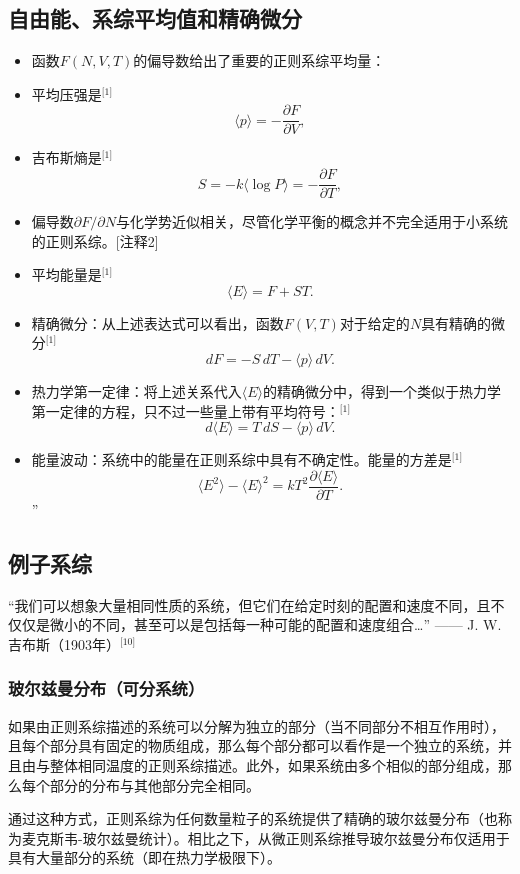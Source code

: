 \subsection{自由能、系综平均值和精确微分}  
\begin{itemize}
\item 函数\( F(N, V, T) \)的偏导数给出了重要的正则系综平均量：  
\item 平均压强是\(^\text{[1]}\)  
\[
\langle p \rangle = -\frac{\partial F}{\partial V},~
\]  
\item 吉布斯熵是\(^\text{[1]}\)  
\[
S = -k \langle \log P \rangle = -\frac{\partial F}{\partial T},~
\]  
\item 偏导数\(\partial F/\partial N\)与化学势近似相关，尽管化学平衡的概念并不完全适用于小系统的正则系综。[注释2]  
\item 平均能量是\(^\text{[1]}\)  
\[
\langle E \rangle = F + S T.~
\]  
\item 精确微分：从上述表达式可以看出，函数\( F(V, T) \)对于给定的\( N \)具有精确的微分\(^\text{[1]}\)  
\[
dF = -S \, dT - \langle p \rangle \, dV.~
\]  
\item 热力学第一定律：将上述关系代入\( \langle E \rangle \)的精确微分中，得到一个类似于热力学第一定律的方程，只不过一些量上带有平均符号：\(^\text{[1]}\)  
\[
d \langle E \rangle = T \, dS - \langle p \rangle \, dV.~
\]  
\item 能量波动：系统中的能量在正则系综中具有不确定性。能量的方差是\(^\text{[1]}\)  
\[
\langle E^2 \rangle - \langle E \rangle^2 = k T^2 \frac{\partial \langle E \rangle}{\partial T}.~
\]”
\end{itemize}
\subsection{例子系综}  
“我们可以想象大量相同性质的系统，但它们在给定时刻的配置和速度不同，且不仅仅是微小的不同，甚至可以是包括每一种可能的配置和速度组合…” —— J. W. 吉布斯（1903年）\(^\text{[10]}\) 
\subsubsection{玻尔兹曼分布（可分系统）}  
如果由正则系综描述的系统可以分解为独立的部分（当不同部分不相互作用时），且每个部分具有固定的物质组成，那么每个部分都可以看作是一个独立的系统，并且由与整体相同温度的正则系综描述。此外，如果系统由多个相似的部分组成，那么每个部分的分布与其他部分完全相同。

通过这种方式，正则系综为任何数量粒子的系统提供了精确的玻尔兹曼分布（也称为麦克斯韦-玻尔兹曼统计）。相比之下，从微正则系综推导玻尔兹曼分布仅适用于具有大量部分的系统（即在热力学极限下）。

